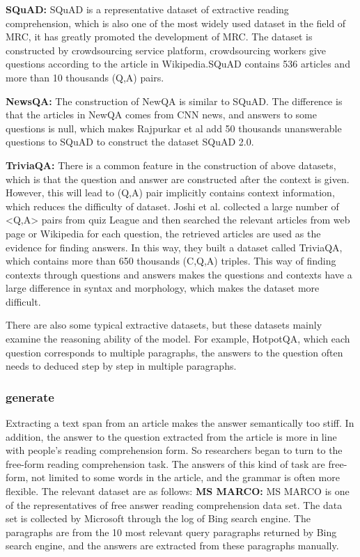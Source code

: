 \noindent\textbf{SQuAD: }SQuAD is a representative dataset of extractive reading comprehension, which is also one of the most widely used 
dataset in the field of MRC, it has greatly promoted the development of MRC. The dataset is constructed by crowdsourcing service platform, crowdsourcing workers give 
questions according to the article in Wikipedia.SQuAD contains 536 articles and more than 10 thousands (Q,A) pairs. 

\noindent\textbf{NewsQA: }The construction of NewQA is similar to SQuAD. The difference is that the articles in NewQA comes from CNN news, and 
answers to some questions is null, which makes Rajpurkar et al add 50 thousands unanswerable questions to SQuAD to construct the dataset SQuAD 2.0.

\noindent\textbf{TriviaQA: }There is a common feature in the construction of above datasets, which is that the question and answer 
are constructed after the context is given. However, this will lead to (Q,A) pair implicitly contains context information, which reduces the 
difficulty of dataset. Joshi et al. collected a large number of <Q,A> pairs from quiz League and then searched the relevant articles from web page or Wikipedia for 
each question, the retrieved articles are used as the evidence for finding answers. In this way, they built a dataset called TriviaQA, which contains more than 650 thousands (C,Q,A) triples. 
This way of finding contexts through questions and answers makes the questions and contexts have a large difference in syntax and morphology, which makes the dataset more difficult.

There are also some typical extractive datasets, but these datasets mainly examine the reasoning ability of the model. For example, HotpotQA, which each question corresponds to multiple paragraphs, 
the answers to the question often needs to deduced step by step in multiple paragraphs. 

\subsubsection{generate}
Extracting a text span from an article makes the answer semantically too stiff. In addition, the answer to the question extracted from 
the article is more in line with people's reading comprehension form. So researchers began to turn to the free-form reading comprehension task. 
The answers of this kind of task are free-form, not limited to some words in the article, and the grammar is often more flexible.
The relevant dataset are as follows:
\noindent\textbf{MS MARCO: }MS MARCO is one of the representatives of free answer reading comprehension data set. 
The data set is collected by Microsoft through the log of Bing search engine. The paragraphs are from the 10 most relevant query paragraphs returned by Bing search engine, and the answers are extracted from these paragraphs manually.

